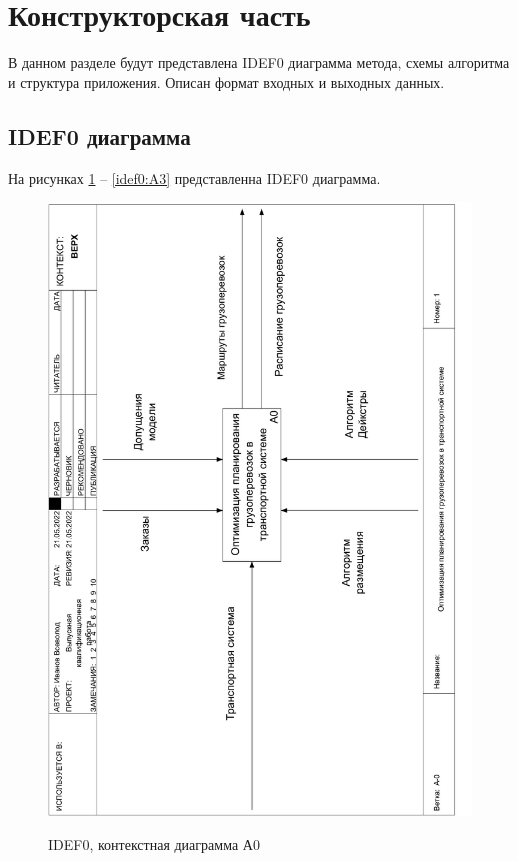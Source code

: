 \section{Конструкторская часть}
В данном разделе будут представлена IDEF0 диаграмма метода, схемы алгоритма и структура приложения. Описан формат входных и выходных данных.

\subsection{IDEF0 диаграмма}
На рисунках \ref{idef0:top} -- \ref{idef0:A3} представленна IDEF0 диаграмма.

\begin{figure}[h]
	\begin{center}
		{\includegraphics[scale=0.63, angle=-90, page=1]{img/idef0.pdf}}
		\caption{IDEF0, контекстная диаграмма А0}
		\label{idef0:top}
	\end{center}
\end{figure}

